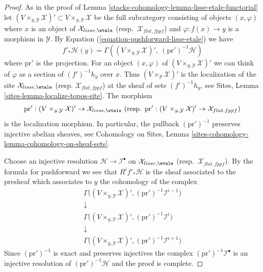 \begin{proof}
As in the proof of Lemma \ref{stacks-cohomology-lemma-lisse-etale-functorial}
let $(V \times_{y, \mathcal{Y}} \mathcal{X})' \subset
V \times_{y, \mathcal{Y}} \mathcal{X}$ be the full subcategory
consisting of objects $(x, \varphi)$ where $x$ is an object of
$\mathcal{X}_{lisse,\etale}$ (resp.\ $\mathcal{X}_{flat,fppf}$)
and $\varphi : f(x) \to y$ is a morphism in $\mathcal{Y}$.
By Equation (\ref{equation-pushforward-lisse-etale})
we have
$$
f'_*\mathcal{H}(y) =
\Gamma((V \times_{y, \mathcal{Y}} \mathcal{X})',
\ (\text{pr}')^{-1}\mathcal{H})
$$
where $\text{pr}'$ is the projection. For an object $(x, \varphi)$
of $(V \times_{y, \mathcal{Y}} \mathcal{X})'$
we can think of $\varphi$ as a section of $(f')^{-1}h_y$ over $x$.
Thus $(V \times_\mathcal{Y} \mathcal{X})'$ is the localization
of the site $\mathcal{X}_{lisse,\etale}$
(resp. $\mathcal{X}_{flat,fppf}$) at the sheaf of sets $(f')^{-1}h_y$, see
Sites, Lemma \ref{sites-lemma-localize-topos-site}. The morphism
$$
\text{pr}' : (V \times_{y, \mathcal{Y}} \mathcal{X})'
\to \mathcal{X}_{lisse,\etale}
\ (\text{resp. }
\text{pr}' : (V \times_{y, \mathcal{Y}} \mathcal{X})'
\to \mathcal{X}_{flat,fppf})
$$
is the localization morphism.
In particular, the pullback $(\text{pr}')^{-1}$ preserves
injective abelian sheaves, see
Cohomology on Sites, Lemma
\ref{sites-cohomology-lemma-cohomology-on-sheaf-sets}.

\medskip\noindent
Choose an injective resolution $\mathcal{H} \to \mathcal{I}^\bullet$
on $\mathcal{X}_{lisse,\etale}$ (resp.\ $\mathcal{X}_{flat,fppf}$).
By the formula for pushforward we see that $R^if'_*\mathcal{H}$ is the
sheaf associated to the presheaf which associates to $y$ the cohomology
of the complex
$$
\begin{matrix}
\Gamma\Big((V \times_{y, \mathcal{Y}} \mathcal{X})',
(\text{pr}')^{-1}\mathcal{I}^{i - 1}\Big) \\
\downarrow \\
\Gamma\Big((V \times_{y, \mathcal{Y}} \mathcal{X})',
(\text{pr}')^{-1}\mathcal{I}^i\Big) \\
\downarrow \\
\Gamma\Big((V \times_{y, \mathcal{Y}} \mathcal{X})',
(\text{pr}')^{-1}\mathcal{I}^{i + 1}\Big)
\end{matrix}
$$
Since $(\text{pr}')^{-1}$ is exact and preserves injectives the
complex $(\text{pr}')^{-1}\mathcal{I}^\bullet$ is an
injective resolution of $(\text{pr}')^{-1}\mathcal{H}$
and the proof is complete.
\end{proof}

